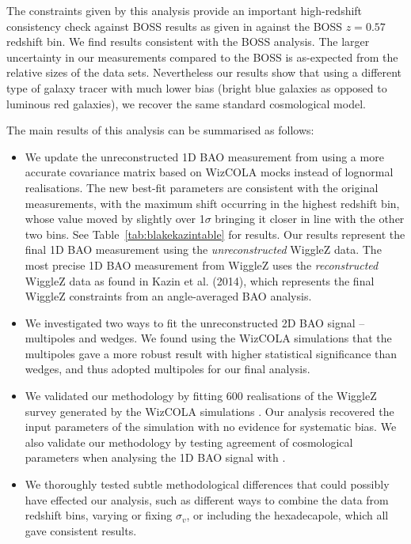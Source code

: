 \documentclass[iop,twocolappendix]{emulateapj}
\newcommand{\red}{\color{red}}
\begin{document}
The constraints given by this analysis provide an important high-redshift consistency check against BOSS results as given in \cite{AndersonAubourg2014DR11} against the BOSS $z=0.57$ redshift bin. We find results consistent with the BOSS analysis. The larger uncertainty in our measurements compared to the BOSS is as-expected from the relative sizes of the data sets.  Nevertheless our results show that using a different type of galaxy tracer with much lower bias (bright blue galaxies as opposed to luminous red galaxies), we recover the same standard cosmological model. 

The main results of this analysis can be summarised as follows:
\begin{itemize}
	\item We update the unreconstructed 1D BAO measurement from \citet{BlakeKazin2011} using a more accurate covariance matrix based on WizCOLA mocks instead of lognormal realisations. The new best-fit parameters are consistent with the original measurements, with the maximum shift occurring in the highest redshift bin, whose value moved by slightly over 1$\sigma$ bringing it closer in line with the other two bins. See Table~\ref{tab:blakekazintable} for results.  Our results represent the final 1D BAO measurement using the {\em unreconstructed} WiggleZ data.  The most precise 1D BAO measurement from WiggleZ uses the {\em reconstructed} WiggleZ data as found in Kazin et al. (2014), which represents the final WiggleZ constraints from an angle-averaged BAO analysis.%
	\item We investigated two ways to fit the unreconstructed 2D BAO signal -- multipoles and wedges.  We found using the WizCOLA simulations that the multipoles gave a more robust result with higher statistical significance than wedges, and thus adopted multipoles for our final analysis.
	\item We validated our methodology by fitting 600 realisations of the WiggleZ survey generated by the WizCOLA simulations \citep{KodaBlake2015}. Our analysis recovered the input parameters of the simulation with no evidence for systematic bias. We also validate our methodology by testing agreement of cosmological parameters when analysing the 1D BAO signal with  \citet{BlakeKazin2011}.
	\item We thoroughly tested subtle methodological differences that could possibly have effected our analysis, such as different ways to combine the data from redshift bins, varying or fixing $\sigma_v$, or including the hexadecapole, which all gave consistent results.

\end{itemize}
\end{document}
